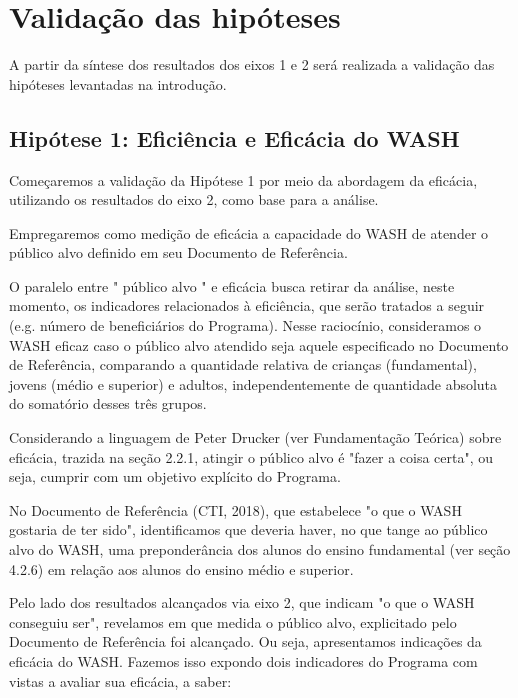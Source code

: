 \section[Validação das hipóteses]{Validação das hipóteses}\label{Validação das hipóteses}
A partir da síntese dos resultados  dos eixos 1 e 2 será realizada  a validação das hipóteses levantadas na introdução.

\subsection[Hipótese 1: Eficiência e Eficácia do WASH]{Hipótese 1: Eficiência e Eficácia do WASH}\label{Hipótese 1: Eficiência e Eficácia do WASH}
Começaremos a validação da Hipótese 1 por meio da abordagem da eficácia, utilizando os resultados do eixo 2, como base para a análise.

Empregaremos como medição de eficácia a capacidade do WASH de atender o público alvo definido em seu Documento de Referência.

O paralelo entre " público alvo " e eficácia busca retirar da análise, neste momento, os indicadores relacionados à eficiência, que serão tratados a seguir (e.g. número de beneficiários do Programa). Nesse raciocínio, consideramos o WASH eficaz caso o público alvo atendido seja aquele especificado no Documento de Referência, comparando a quantidade relativa de crianças (fundamental), jovens (médio e superior) e adultos, independentemente de quantidade absoluta do somatório desses três grupos.

Considerando a linguagem de Peter Drucker (ver Fundamentação Teórica) sobre eficácia, trazida na seção 2.2.1, atingir o público alvo é "fazer a coisa certa", ou seja, cumprir com um objetivo explícito do Programa.

No Documento de Referência (CTI, 2018), que estabelece "o que o WASH gostaria de ter sido", identificamos que deveria haver, no que tange ao público alvo do WASH, uma preponderância dos alunos do ensino fundamental (ver seção 4.2.6) em relação aos alunos do ensino médio e superior.

Pelo lado dos resultados alcançados via eixo 2, que indicam "o que o WASH conseguiu ser", revelamos em que medida o público alvo, explicitado pelo  Documento de Referência foi alcançado. Ou seja, apresentamos indicações da eficácia do WASH. Fazemos isso expondo dois indicadores do Programa com vistas a avaliar sua eficácia, a saber:


